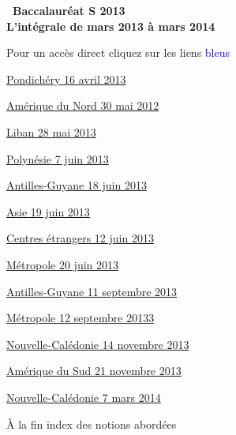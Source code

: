 \documentclass[10pt]{article}
\begin{document}
\setlength\parindent{0mm}
\renewcommand \footrulewidth{.2pt}
\pagestyle{fancy}
\thispagestyle{empty} 
\begin{center}
{\huge\textbf{\decofourleft~Baccalauréat S  
2013~\decofourright\\ \vspace{1cm} L'intégrale de mars 2013 à  mars 2014}}

\vspace{1cm}

Pour un accès direct cliquez sur les liens {\Large 
\textcolor{blue}{bleus}}
\end{center}

\vspace{1cm}
 
{\Large 
   
\hyperlink{Pondichery}{Pondichéry  16 avril 2013}   \medskip

\hyperlink{AmeriqueNord}{Amérique du Nord 30  mai 2012}   \medskip

\hyperlink{Liban}{Liban  28  mai 2013}   \medskip

\hyperlink{Polynesie}{Polynésie 7  juin 2013}   \medskip

\hyperlink{Antilles}{Antilles-Guyane 18 juin 2013}   \medskip

\hyperlink{Asie}{Asie 19  juin 2013}   \medskip

\hyperlink{Centres etrangers}{Centres étrangers 12  juin 2013}   \medskip

\hyperlink{Metropole}{Métropole  20 juin 2013}   \medskip


\hyperlink{Antillessep}{Antilles-Guyane  11 septembre 2013}   \medskip

\hyperlink{Metropolesep}{Métropole  12 septembre 20133}   \medskip

\hyperlink{Caledonienov}{Nouvelle-Calédonie   14 novembre 2013}   \medskip

\hyperlink{AmeriSud}{Amérique du Sud  21 novembre 2013}   \medskip


\hyperlink{Caledoniemars}{Nouvelle-Calédonie   7 mars 2014}   \medskip}

\vspace{1cm}À la fin index des notions abordées
\newpage ~
\newpage
\hypertarget{Pondichery}{}
\end{document}
